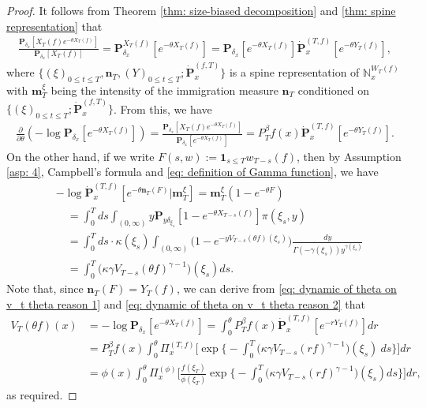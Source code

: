 \begin{proof}
	It follows from Theorem \ref{thm: size-biased decomposition} and \ref{thm: spine representation} that
\begin{align}
	\frac{ \mathbf P_{\delta_x}[X_T(f)e^{-\theta X_T(f)}] } {  \mathbf P_{\delta_x} [X_T(f)] }
	= \mathbf P_{\delta_x}^{X_T(f)} [e^{-\theta X_T(f)}]
	= \mathbf P_{\delta_x} [e^{-\theta X_T(f)}] \dot {\mathbf P}_x^{(T,f)}[e^{-\theta Y_T(f)}],
\end{align}
	where $\{(\xi)_{0\le t\le T}, \mathbf n_T, (Y)_{0\le t\le T}; \dot {\mathbf P}^{(f,T)}_x\}$ is a spine representation of $\mathbb N^{W_T(f)}_x$ with $\mathbf m^\xi_T$ being the intensity of the immigration measure $\mathbf n_T$ conditioned on $\{(\xi)_{0\le t\le T}; \dot {\mathbf P}^{(f,T)}_x\}$.
	From this, we have
\begin{align} \label{eq: dynamic of theta on v_t theta reason 1}
	\frac{\partial}{\partial \theta}
	(-\log \mathbf P_{\delta_x}[e^{-\theta X_T(f)}])
	= \frac{\mathbf P_{\delta_x}[X_T(f)e^{-\theta X_T(f)}]}{\mathbf P_{\delta_x}[e^{-\theta X_T(f)}]}
	= P^\beta_T f(x) \dot {\mathbf P}_x^{(T,f)}[e^{-\theta Y_T(f)}].
\end{align}
	On the other hand, if we write $F(s,w):= \mathbf 1_{s\leq T} w_{T-s}(f)$, then by Assumption \ref{asp: 4}, Campbell's formula and \eqref{eq: definition of Gamma function}, we have
\begin{align}\label{eq: dynamic of theta on v_t theta reason 2}
	&-\log \dot {\mathbf P}^{(T,f)}_{x}[e^{-\theta \mathbf n_T(F)}|\mathbf m_T^\xi]
	= \mathbf m_T^\xi(1-e^{-\theta F})
	\\&\quad = \int_0^T ds \int_{(0,\infty)} y \mathbf P_{y\delta_{\xi_s}}[1- e^{-\theta X_{T-s}(f)}] \pi(\xi_s,y)
	\\&\quad = \int_0^T ds \cdot \kappa(\xi_s) \int_{(0,\infty)} \mathbf (1- e^{- y V_{T-s}(\theta f)(\xi_s)}) \frac{dy}{\Gamma(-\gamma(\xi_s)) y^{\gamma(\xi_s)}}
	\\&\quad = \int_0^T \big(\kappa\gamma V_{T-s}(\theta f)^{\gamma-1}\big)(\xi_s) ds.
\end{align}
	Note that, since $\mathbf n_T(F)= Y_T(f)$, we can derive from \eqref{eq: dynamic of theta on v_t theta reason 1} and \eqref{eq: dynamic of theta on v_t theta reason 2} that
\begin{align}
	V_T(\theta f)(x)
	&= -\log \mathbf P_{\delta_x}[e^{-\theta X_T(f)}]
	= \int_0^\theta P^\beta_Tf(x)
	\dot {\mathbf P}_x^{(T,f)}[e^{-r  Y_T(f)}] dr
	\\&=P^\beta_Tf(x)\int_0^\theta \Pi_x^{(T,f)} \Big[\exp\Big\{-\int_0^T \big(\kappa\gamma V_{T-s}(r f)^{\gamma-1}\big)(\xi_s)~ds\Big\}\Big] dr
	\\&= \phi( x) \int_0^\theta \Pi_x^{(\phi)} \Big[ \frac{ f(\xi_T) } { \phi(\xi_T) } \exp\Big\{ - \int_0^T \big( \kappa \gamma V_{T-s} (r f)^{ \gamma - 1} \big) ( \xi_s) ds\Big\} \Big] dr,
\end{align}
	as required.
\end{proof}

